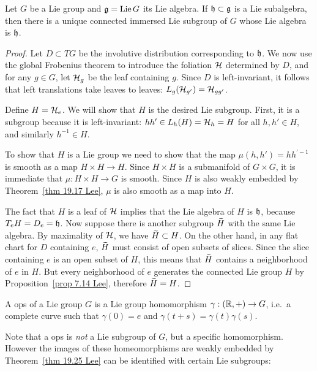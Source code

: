 \begin{thm} Let $G$ be a Lie group and $\mathfrak{g}=\operatorname{Lie} G$ its Lie algebra. If $\mathfrak{h}\subset \mathfrak{g}$ is a Lie subalgebra, then there is a unique connected immersed Lie subgroup of $G$ whose Lie algebra is $\mathfrak{h}$.
\end{thm}
\begin{proof}
    Let $D\subset TG$ be the involutive distribution corresponding to $\mathfrak{h}$. We now use the global Frobenius theorem to introduce the foliation $\mathcal{H}$ determined by $D$, and for any $g\in G$, let $\mathcal{H}_g$ be the leaf containing $g$. Since $D$ is left-invariant, it follows that left translations take leaves to leaves: $L_g(\mathcal{H}_{g'})=\mathcal{H}_{gg'}$.

    Define $H=\mathcal{H}_e$. We will show that $H$ is the desired Lie subgroup. First, it is a subgroup because it is left-invariant: $hh'\in L_h(H)=\mathcal{H}_h=H$ for all $h,h'\in H$, and similarly $h^{-1}\in H$.

    To show that $H$ is a Lie group we need to show that the map $\mu(h,h')=hh^{\prime -1}$ is smooth as a map $H\times H\to H$. Since $H\times H$ is a submanifold of $G\times G$, it is immediate that $\mu:H\times H\to G$ is smooth. Since $H$ is also weakly embedded by Theorem~\ref{thm 19.17 Lee}, $\mu$ is also smooth as a map into $H$.

    The fact that $H$ is a leaf of $\mathcal{H}$ implies that the Lie algebra of $H$ is $\mathfrak{h}$, because $T_eH=D_e=\mathfrak{h}$. Now suppose there is another subgroup $\wt{H}$ with the same Lie algebra. By maximality of $\mathcal{H}$, we have $\wt H\subset H$. On the other hand, in any flat chart for $D$ containing $e$, $\wt H$ must consist of open subsets of slices. Since the slice containing $e$ is an open subset of $H$, this means that $\wt H$ contains a neighborhood of $e$ in $H$. But every neighborhood of $e$ generates the connected Lie group $H$ by Proposition~\ref{prop 7.14 Lee}, therefore $\wt H=H$.
\end{proof}


\begin{defn}
    A \gls{ops} of a Lie group $G$ is a Lie group homomorphism $\gamma:(\mathbb{R},+)\to G$, i.e.~a complete curve such that $\gamma(0)=e$ and $\gamma(t+s)=\gamma(t)\gamma(s)$.
\end{defn}

Note that a \gls{ops} is \emph{not} a Lie subgroup of $G$, but a specific homomorphism. However the images of these homeomorphisms are weakly embedded by Theorem~\ref{thm 19.25 Lee} can be identified with certain Lie subgroups:

